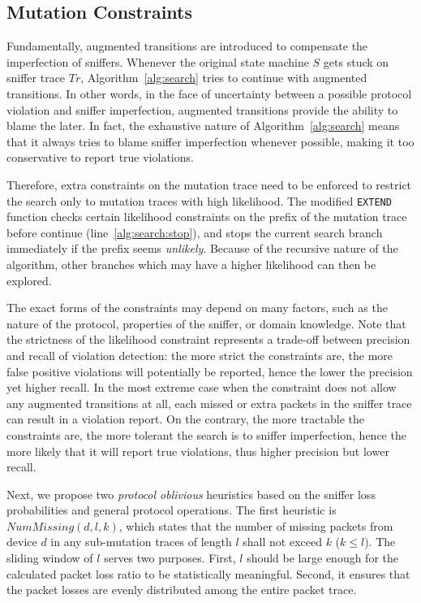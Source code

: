 \subsection{Mutation Constraints}
\label{subsec:heuristic}

Fundamentally, augmented transitions are introduced to compensate the
imperfection of sniffers.
%
Whenever the original state machine $S$ gets stuck on
sniffer trace $Tr$, Algorithm~\ref{alg:search} tries to continue with augmented
transitions.
%
In other words, in the face of uncertainty between a possible
protocol violation and sniffer imperfection, augmented transitions provide the
ability to blame the later.
%
In fact, the exhaustive nature of Algorithm~\ref{alg:search} means that it
always tries to blame sniffer imperfection whenever possible, making it too
conservative to report true violations.

Therefore, extra constraints on the mutation trace need to be enforced to
restrict the search only to mutation traces with high likelihood.
%
The modified
\texttt{EXTEND} function checks certain likelihood constraints on the prefix of
the mutation trace before continue (line~\ref{alg:search:stop}), and stops the
current search branch immediately if the prefix seems \textit{unlikely}.
%
Because of the recursive nature of the algorithm, other branches which may have
a higher likelihood can then be explored.

The exact forms of the constraints may depend on many factors, such as the
nature of the protocol, properties of the sniffer, or domain knowledge.
%
Note that the strictness of the likelihood constraint represents a trade-off
between precision and recall of violation detection: the more strict the
constraints are, the more false positive violations will potentially be reported,
hence the lower the precision yet higher recall.
%
In the most extreme case when
the constraint does not allow any augmented transitions at all, each missed or
extra packets in the sniffer trace can result in a violation report.
%
On the contrary, the more tractable the constraints are, the more tolerant the
search is to sniffer imperfection, hence the more likely that it will report
true violations, thus higher precision but lower recall.

Next, we propose two \textit{protocol oblivious} heuristics based on the sniffer
loss probabilities and general protocol operations.
%
The first heuristic is $NumMissing(d, l, k)$, which states that the number
of missing packets from device $d$ in any sub-mutation traces of length $l$
shall not exceed $k$ ($k \le l$).
%
The sliding window of $l$ serves two purposes.
%
First, $l$ should be large enough for the calculated packet loss ratio to be
statistically meaningful.
%
Second, it ensures that the packet losses are evenly distributed among the
entire packet trace.


